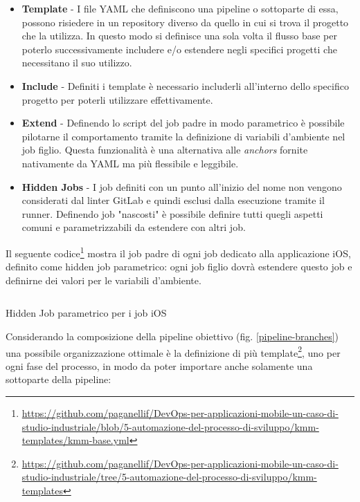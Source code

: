 \begin{itemize}
    \item \textbf{Template} - I file YAML che definiscono una pipeline o sottoparte di essa, possono risiedere in un repository diverso da quello in cui si trova il progetto che la utilizza. In questo modo si definisce una sola volta il flusso base per poterlo successivamente includere e/o estendere negli specifici progetti che necessitano il suo utilizzo.
    \item \textbf{Include} - Definiti i template è necessario includerli all'interno dello specifico progetto per poterli utilizzare effettivamente.
    \item \textbf{Extend} - Definendo lo script del job padre in modo parametrico è possibile pilotarne il comportamento tramite la definizione di variabili d'ambiente nel job figlio. Questa funzionalità è una alternativa alle \textit{anchors} fornite nativamente da YAML ma più flessibile e leggibile.
    \item \textbf{Hidden Jobs} - I job definiti con un punto all'inizio del nome non vengono considerati dal linter GitLab e quindi esclusi dalla esecuzione tramite il runner. Definendo job "nascosti" è possibile definire tutti quegli aspetti comuni e parametrizzabili da estendere con altri job.
\end{itemize}

Il seguente codice\footnote{\href{https://github.com/paganellif/DevOps-per-applicazioni-mobile-un-caso-di-studio-industriale/blob/5-automazione-del-processo-di-sviluppo/kmm-templates/kmm-base.yml}{https://github.com/paganellif/DevOps-per-applicazioni-mobile-un-caso-di-studio-industriale/blob/5-automazione-del-processo-di-sviluppo/kmm-templates/kmm-base.yml}} mostra il job padre di ogni job dedicato alla applicazione iOS, definito come hidden job parametrico: ogni job figlio dovrà estendere questo job e definirne dei valori per le variabili d'ambiente.

\begin{listing}[H]
    \inputminted{yaml}{code/base-ios-job.yaml}
    \caption{Hidden Job parametrico per i job iOS}
\end{listing}

Considerando la composizione della pipeline obiettivo (fig. \ref{pipeline-branches}) una possibile organizzazione ottimale è la definizione di più template\footnote{\href{https://github.com/paganellif/DevOps-per-applicazioni-mobile-un-caso-di-studio-industriale/tree/5-automazione-del-processo-di-sviluppo/kmm-templates}{https://github.com/paganellif/DevOps-per-applicazioni-mobile-un-caso-di-studio-industriale/tree/5-automazione-del-processo-di-sviluppo/kmm-templates}}, uno per ogni fase del processo, in modo da poter importare anche solamente una sottoparte della pipeline:

